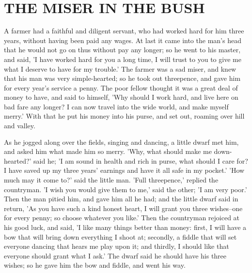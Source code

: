 \documentclass[12pt]{book}
\begin{document}
\chapter{THE MISER IN THE BUSH}

A farmer had a faithful and diligent servant, who had worked hard for
him three years, without having been paid any wages. At last it came
into the man's head that he would not go on thus without pay any
longer; so he went to his master, and said, 'I have worked hard for
you a long time, I will trust to you to give me what I deserve to have
for my trouble.' The farmer was a sad miser, and knew that his man was
very simple-hearted; so he took out threepence, and gave him for every
year's service a penny. The poor fellow thought it was a great deal of
money to have, and said to himself, 'Why should I work hard, and live
here on bad fare any longer? I can now travel into the wide world, and
make myself merry.' With that he put his money into his purse, and set
out, roaming over hill and valley.

As he jogged along over the fields, singing and dancing, a little
dwarf met him, and asked him what made him so merry. 'Why, what should
make me down-hearted?' said he; 'I am sound in health and rich in
purse, what should I care for? I have saved up my three years'
earnings and have it all safe in my pocket.' 'How much may it come
to?' said the little man. 'Full threepence,' replied the countryman.
'I wish you would give them to me,' said the other; 'I am very poor.'
Then the man pitied him, and gave him all he had; and the little dwarf
said in return, 'As you have such a kind honest heart, I will grant
you three wishes--one for every penny; so choose whatever you like.'
Then the countryman rejoiced at his good luck, and said, 'I like many
things better than money: first, I will have a bow that will bring
down everything I shoot at; secondly, a fiddle that will set everyone
dancing that hears me play upon it; and thirdly, I should like that
everyone should grant what I ask.' The dwarf said he should have his
three wishes; so he gave him the bow and fiddle, and went his way.
\end{document}
